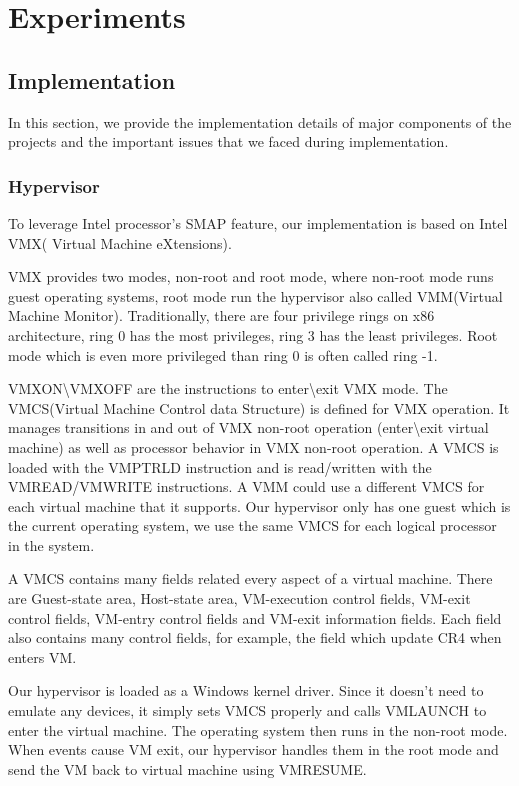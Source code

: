 
\section{Experiments}

\subsection{Implementation}
\label{sec:implementation}

In this section, we provide the implementation details of major components of the projects and the important issues that we faced during implementation.

\subsubsection{Hypervisor}

To leverage Intel processor's SMAP feature, our implementation is based on Intel VMX( Virtual Machine eXtensions).

VMX provides two modes, non-root and root mode, where non-root mode runs guest operating systems, root mode run the hypervisor also called VMM(Virtual Machine Monitor). Traditionally, there are four privilege rings on x86 architecture, ring 0 has the most privileges, ring 3 has the least privileges. Root mode which is even more privileged than ring 0 is often called ring -1.


VMXON\textbackslash{}VMXOFF are the instructions to enter\textbackslash{}exit VMX mode. The VMCS(Virtual Machine Control data Structure) is defined for VMX operation. It manages transitions in and out of VMX non-root operation (enter\textbackslash{}exit virtual machine) as well as processor behavior in VMX non-root operation. A VMCS is loaded with the VMPTRLD instruction and is read/written with the VMREAD/VMWRITE instructions. A VMM could use a different VMCS for each virtual machine that it supports. Our hypervisor only has one guest which is the current operating system, we use the same VMCS for each logical processor in the system. 

A VMCS contains many fields related every aspect of a virtual machine. There are Guest-state area, Host-state area, VM-execution control fields, VM-exit control fields, VM-entry control fields and VM-exit information fields. Each field also contains many control fields, for example, the field which update CR4 when enters VM.

Our hypervisor is loaded as a Windows kernel driver. Since it doesn't need to emulate any devices, it simply sets VMCS properly and calls VMLAUNCH to enter the virtual machine. The operating system then runs in the non-root mode. When events cause VM exit, our hypervisor handles them in the root mode and send the VM back to virtual machine using VMRESUME. 

